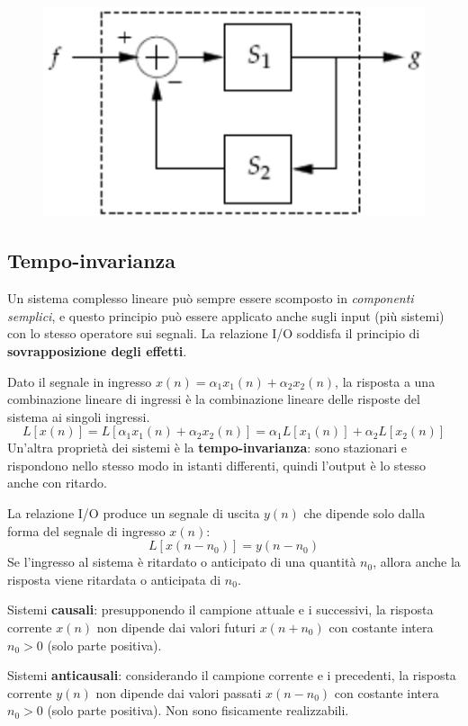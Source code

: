 \begin{figure}[h]
	\centering
	\includegraphics[scale=0.4]{Lezioni/Immagini/retroazione}
\end{figure}

\subsection{Tempo-invarianza}
Un sistema complesso lineare può sempre essere scomposto in \textit{componenti semplici}, e questo principio può essere applicato anche sugli input (più sistemi) con lo stesso operatore sui segnali. La relazione I/O soddisfa il principio di \textbf{sovrapposizione degli effetti}. 

Dato il segnale in ingresso $x(n) = \alpha_1x_1(n) + \alpha_2x_2(n)$, la risposta a una combinazione lineare di ingressi è la combinazione lineare delle risposte del sistema ai singoli ingressi.
$$L[x(n)] = L[\alpha_1x_1(n) + \alpha_2x_2(n)] = \alpha_1L[x_1(n)] + \alpha_2L[x_2(n)]$$
Un'altra proprietà dei sistemi è la \textbf{tempo-invarianza}: sono stazionari e rispondono nello stesso modo in istanti differenti, quindi l'output è lo stesso anche con ritardo. 

La relazione I/O produce un segnale di uscita $y(n)$ che dipende solo dalla forma del segnale di ingresso $x(n)$:
$$L[x(n - n_0)] = y(n - n_0)$$
Se l'ingresso al sistema è ritardato o anticipato di una quantità $n_0$, allora anche la risposta viene ritardata o anticipata di $n_0$.

Sistemi \textbf{causali}: presupponendo il campione attuale e i successivi, la risposta corrente $x(n)$ non dipende dai valori futuri $x(n + n_0)$ con costante intera $n_0 > 0$ (solo parte positiva).

Sistemi \textbf{anticausali}: considerando il campione corrente e i precedenti, la risposta corrente $y(n)$ non dipende dai valori passati $x(n - n_0)$ con costante intera $n_0 > 0$ (solo parte positiva). Non  sono fisicamente realizzabili.

